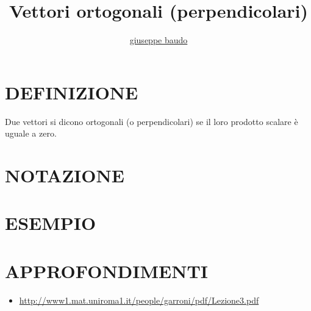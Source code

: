 \documentclass[a4paper,10pt]{article}
\title{Vettori ortogonali (perpendicolari)}
\author{\href{http://www.baudo.hol.es}{giuseppe baudo}}
\begin{document}
\maketitle

\section{DEFINIZIONE}
Due vettori si dicono ortogonali (o perpendicolari) se il loro prodotto scalare è uguale a zero.

\section{NOTAZIONE}

\section{ESEMPIO}

\section{APPROFONDIMENTI}
\begin{itemize}
 \item \url{http://www1.mat.uniroma1.it/people/garroni/pdf/Lezione3.pdf}
\end{itemize}
\end{document}
